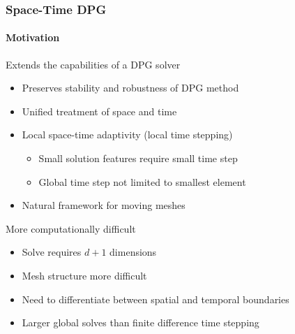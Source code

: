\documentclass[18pt,xcolor=table]{beamer}
\begin{document}
\begin{frame}[t]
\frametitle{Space-Time DPG}
\framesubtitle{Motivation}
Extends the capabilities of a DPG solver
\begin{itemize}
  \item Preserves stability and robustness of DPG method
  \item Unified treatment of space and time
  \item Local space-time adaptivity (local time stepping)
  \begin{itemize}
    \item Small solution features require small time step
    \item Global time step not limited to smallest element
  \end{itemize}
  \item Natural framework for moving meshes
\end{itemize}
\bigskip

More computationally difficult
\begin{itemize}
  \item Solve requires $d+1$ dimensions
  \item Mesh structure more difficult
  \item Need to differentiate between spatial and temporal boundaries
  \item Larger global solves than finite difference time stepping
\end{itemize}
\end{frame}
\end{document}
